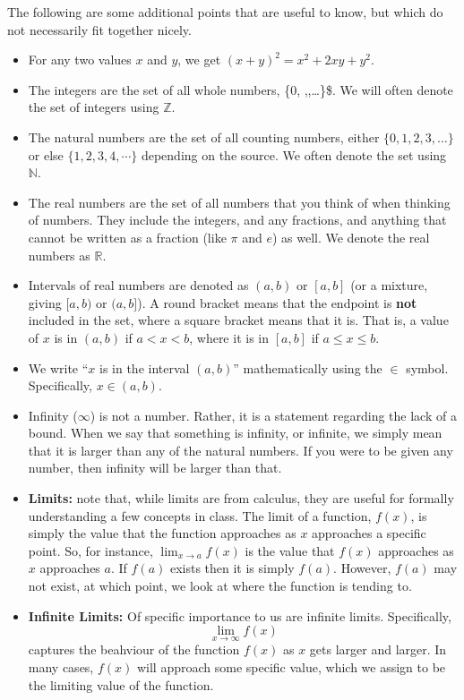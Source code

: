\documentclass[
  letterpaper,
  DIV=11,
  numbers=noendperiod]{scrreprt}
\providecommand{\tightlist}{%
  \setlength{\itemsep}{0pt}\setlength{\parskip}{0pt}}\usepackage{longtable,booktabs,array}
\theoremstyle{definition}
\theoremstyle{definition}
\theoremstyle{definition}
\theoremstyle{remark}
\begin{document}
The following are some additional points that are useful to know, but
which do not necessarily fit together nicely.

\begin{itemize}
\tightlist
\item
  For any two values \(x\) and \(y\), we get
  \((x + y)^2 = x^2 + 2xy + y^2\).
\item
  The integers are the set of all whole numbers, \{0,
  ,,\dots\}\$. We will often denote the set of integers using
  \(\mathbb{Z}\).
\item
  The natural numbers are the set of all counting numbers, either
  \(\{0,1,2,3,\dots\}\) or else \(\{1,2,3,4,\cdots\}\) depending on the
  source. We often denote the set using \(\mathbb{N}\).
\item
  The real numbers are the set of all numbers that you think of when
  thinking of numbers. They include the integers, and any fractions, and
  anything that cannot be written as a fraction (like \(\pi\) and \(e\))
  as well. We denote the real numbers as \(\mathbb{R}\).
\item
  Intervals of real numbers are denoted as \((a,b)\) or \([a,b]\) (or a
  mixture, giving \([a,b)\) or \((a,b]\)). A round bracket means that
  the endpoint is \textbf{not} included in the set, where a square
  bracket means that it is. That is, a value of \(x\) is in \((a,b)\) if
  \(a < x < b\), where it is in \([a,b]\) if \(a \leq x \leq b\).
\item
  We write ``\(x\) is in the interval \((a,b)\)'' mathematically using
  the \(\in\) symbol. Specifically, \(x \in (a,b)\).
\item
  Infinity (\(\infty\)) is not a number. Rather, it is a statement
  regarding the lack of a bound. When we say that something is infinity,
  or infinite, we simply mean that it is larger than any of the natural
  numbers. If you were to be given any number, then infinity will be
  larger than that.
\item
  \textbf{Limits:} note that, while limits are from calculus, they are
  useful for formally understanding a few concepts in class. The limit
  of a function, \(f(x)\), is simply the value that the function
  approaches as \(x\) approaches a specific point. So, for instance,
  \(\lim_{x\to a} f(x)\) is the value that \(f(x)\) approaches as \(x\)
  approaches \(a\). If \(f(a)\) exists then it is simply \(f(a)\).
  However, \(f(a)\) may not exist, at which point, we look at where the
  function is tending to.
\item
  \textbf{Infinite Limits:} Of specific importance to us are infinite
  limits. Specifically, \[\lim_{x\to\infty}f(x)\] captures the beahviour
  of the function \(f(x)\) as \(x\) gets larger and larger. In many
  cases, \(f(x)\) will approach some specific value, which we assign to
  be the limiting value of the function.
\end{itemize}
\end{document}
